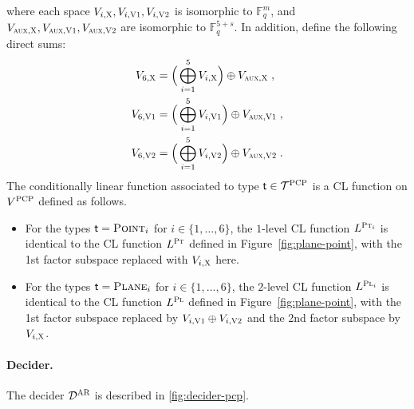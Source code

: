 \documentclass[11pt]{article}
\theoremstyle{definition}
\newcommand{\F}{\ensuremath{\mathbb{F}}}
\newcommand{\decider}{\mathcal{D}}
\newcommand{\type}{\mathcal{T}}
\newcommand{\gamestyle}[1]{\ensuremath{\textsc{#1}}\xspace}
\newcommand{\pcp}{\gamestyle{PCP}}
\newcommand{\ar}{\gamestyle{AR}}
\newcommand{\labelstyle}[1]{\ensuremath{\textsc{#1}}\xspace}
\newcommand{\aux}{\labelstyle{aux}}
\newcommand{\xpt}{\labelstyle{X}}
\newcommand{\dir}[1]{\labelstyle{V#1}}
\newcommand{\plf}{\labelstyle{Pl}}
\newcommand{\ptf}{\labelstyle{Pt}}
\newcommand{\tvarstyle}[1]{\mathsf{#1}}
\newcommand{\tvar}{\ensuremath{\tvarstyle{t}}}
\newcommand{\typestyle}[1]{\ensuremath{\textsc{#1}}\xspace}
\newcommand{\Plane}{\typestyle{Plane}}
\newcommand{\Point}{\typestyle{Point}}
\begin{document}
where each space $V_{i,\xpt}, V_{i, \dir{1}}, V_{i, \dir{2}}$ is isomorphic to
$\F_{q}^{m}$, and $V_{\aux, \xpt}, V_{\aux, \dir{1}}, V_{\aux, \dir{2}}$ are
isomorphic to $\F_q^{5 + s}$.
In addition, define the following direct sums:
\begin{align*}
  V_{6, \xpt} & = \Big( \bigoplus_{i=1}^{5} V_{i, \xpt} \Big) \oplus V_{\aux, \xpt}\;,\\
  V_{6, \dir{1}} & = \Big( \bigoplus_{i=1}^{5} V_{i, \dir{1}} \Big) \oplus
                   V_{\aux, \dir{1}}\;,\\
  V_{6, \dir{2}} & = \Big( \bigoplus_{i=1}^{5} V_{i, \dir{2}} \Big) \oplus
                   V_{\aux, \dir{2}}\;.
\end{align*}
The conditionally linear function associated to type $\tvar \in \type^\pcp$ is a
CL function on $V^\pcp$ defined as follows.
\begin{itemize}
\item For the types $\tvar = \Point_i$ for $i \in \{1, \dots, 6\}$, the
  $1$-level CL function $L^{\ptf_i}$ is identical to the CL function $L^\ptf$
  defined in Figure~\ref{fig:plane-point}, with the 1st factor subspace replaced
  with $V_{i, \xpt}$ here.
\item For the types $\tvar = \Plane_i$ for $i \in \{ 1, \dots, 6\}$, the
    $2$-level CL function $L^{\plf_i}$ is identical to the CL function $L^\plf$
  defined in Figure~\ref{fig:plane-point}, with the 1st factor subspace replaced
  by $V_{i, \dir{1}} \oplus V_{i, \dir{2}}$ and the 2nd factor subspace by
  $V_{i, \xpt}$.
\end{itemize}

\paragraph{Decider.}
The decider $\decider^\ar$ is described in \cref{fig:decider-pcp}.
\end{document}

